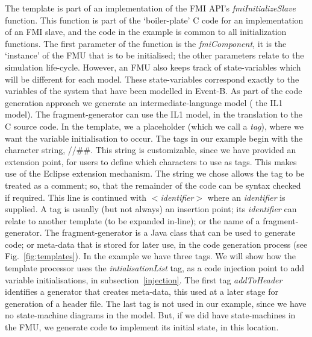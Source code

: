 \documentclass{llncs}%
\begin{document}
The template is part of an implementation of the FMI API's \emph{fmiInitializeSlave} function. This function is part of the `boiler-plate' C code for an implementation of an FMI slave, and the code in the example is common to all initialization functions. The first parameter of the function is the \emph{fmiComponent}, it is the `instance' of the FMU that is to be initialised; the other parameters relate to the simulation life-cycle.  However, an FMU also keeps track of state-variables which will be different for each model. These state-variables correspond exactly to the variables of the system that have been modelled in Event-B. As part of the code generation approach we generate an intermediate-language model ( the IL1 model). The fragment-generator can use the IL1 model, in the translation to the C source code.  In the template, we a placeholder (which we call a \emph{tag}), where we want the variable initialisation to occur. The tags in our example begin with the character string, //\#\#.  This string is customizable, since we have provided an extension point, for users to define which characters to use as tags. This makes use of the Eclipse extension mechanism. The string we chose allows the tag to be treated as a comment; so, that the remainder of the code can be syntax checked if required. This line is continued with $<$\emph{identifier}$>$ where an \emph{identifier} is supplied. A tag is usually (but not always) an insertion point; its \emph{identifier} can relate to another template (to be expanded in-line); or the name of a fragment-generator. The fragment-generator is a Java class that can be used to generate code; or meta-data that is stored for later use, in the code generation process  (see Fig.~\ref{fig:templates}). In the example we have three tags. We will show how the template processor uses the \emph{intialisationList} tag, as a code injection point to add variable initialisations, in subsection~\ref{injection}. The first tag \emph{addToHeader} identifies a generator that creates meta-data, this used at a later stage for generation of a header file. The last tag is not used in our example, since we have no state-machine diagrams in the model. But, if we did have state-machines in the FMU, we generate code to implement its initial state, in this location.
%
\end{document}
